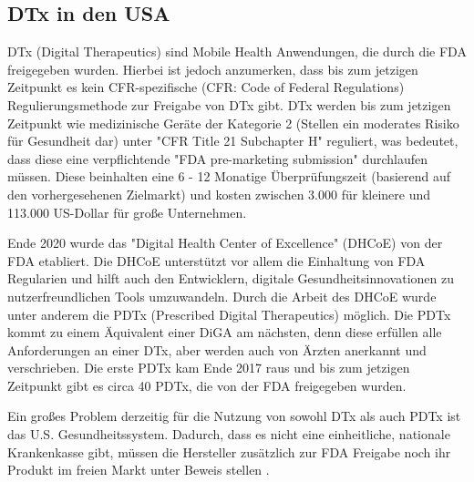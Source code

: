 \documentclass{article}
\begin{document}
		\subsection{DTx in den USA}
			DTx (Digital Therapeutics) sind Mobile Health Anwendungen, die durch die FDA freigegeben wurden. Hierbei ist jedoch anzumerken, dass bis zum jetzigen Zeitpunkt es kein CFR-spezifische (CFR: Code of Federal Regulations) Regulierungsmethode zur Freigabe von DTx gibt. DTx werden bis zum jetzigen Zeitpunkt wie medizinische Geräte der Kategorie 2 (Stellen ein moderates Risiko für Gesundheit dar) unter "CFR Title 21 Subchapter H" reguliert, was bedeutet, dass diese eine verpflichtende "FDA pre-marketing submission" durchlaufen müssen. Diese beinhalten eine 6 - 12 Monatige Überprüfungszeit (basierend auf den vorhergesehenen Zielmarkt) und kosten zwischen 3.000 für kleinere und 113.000 US-Dollar für große Unternehmen.\par
			Ende 2020 wurde das "Digital Health Center of Excellence" (DHCoE) von der FDA etabliert. Die DHCoE unterstützt vor allem die Einhaltung von FDA Regularien und hilft auch den Entwicklern, digitale Gesundheitsinnovationen zu nutzerfreundlichen Tools umzuwandeln. Durch die Arbeit des DHCoE wurde unter anderem die PDTx (Prescribed Digital Therapeutics) möglich. Die PDTx kommt zu einem Äquivalent einer DiGA am nächsten, denn diese erfüllen alle Anforderungen an einer DTx, aber werden auch von Ärzten anerkannt und verschrieben. Die erste PDTx kam Ende 2017 raus und bis zum jetzigen Zeitpunkt gibt es circa 40 PDTx, die von der FDA freigegeben wurden.\par
			Ein großes Problem derzeitig für die Nutzung von sowohl DTx als auch PDTx ist das U.S. Gesundheitssystem. Dadurch, dass es nicht eine einheitliche, nationale Krankenkasse gibt, müssen die Hersteller zusätzlich zur FDA Freigabe noch ihr Produkt im freien Markt unter Beweis stellen \cite{dtx-usa}.
\end{document}
